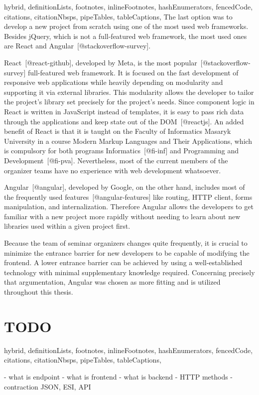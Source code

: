 \documentclass[
  digital, %
  oneside, %
  lof,     %
  lot,     %
]{fithesis4}
\begin{document}
\begin{markdown*}{%
  hybrid,
  definitionLists,
  footnotes,
  inlineFootnotes,
  hashEnumerators,
  fencedCode,
  citations,
  citationNbsps,
  pipeTables,
  tableCaptions,
}
The last option was to develop a new project from scratch using one of the most used web frameworks. Besides jQuery, which is not a full-featured web framework, the most used ones are React and Angular~[@stackoverflow-survey].

React~[@react-github], developed by Meta, is the most popular~[@stackoverflow-survey] full-featured web framework. It is focused on the fast development of responsive web applications while heavily depending on modularity and supporting it via external libraries. This modularity allows the developer to tailor the project's library set precisely for the project's needs. Since component logic in React is written in JavaScript instead of templates, it is easy to pass rich data through the applications and keep state out of the DOM~[@reactjs]. An added benefit of React is that it is taught on the Faculty of Informatics Masaryk University in a course Modern Markup Languages and Their Applications, which is compulsory for both programs Informatics~[@fi-inf] and 
Programming and Development~[@fi-pva]. Nevertheless, most of the current members of the organizer teams have no experience with web development whatsoever.

Angular~[@angular], developed by Google, on the other hand, includes most of the frequently used features~[@angular-features] like routing, HTTP client, forms manipulation, and internalization. Therefore Angular allows the developers to get familiar with a new project more rapidly without needing to learn about new libraries used within a given project first.

Because the team of seminar organizers changes quite frequently, it is crucial to minimize the entrance barrier for new developers to be capable of modifying the frontend. A lower entrance barrier can be achieved by using a well-established technology with minimal supplementary knowledge required. Concerning precisely that argumentation, Angular was chosen as more fitting and is utilized throughout this thesis.

\end{markdown*}

\chapter{TODO}
\shorthandoff{-}
\begin{markdown*}{%
  hybrid,
  definitionLists,
  footnotes,
  inlineFootnotes,
  hashEnumerators,
  fencedCode,
  citations,
  citationNbsps,
  pipeTables,
  tableCaptions,
}

- what is endpoint
- what is frontend
- what is backend
- HTTP methods
- contraction JSON, ESI, API

\end{markdown*}
\end{document}
